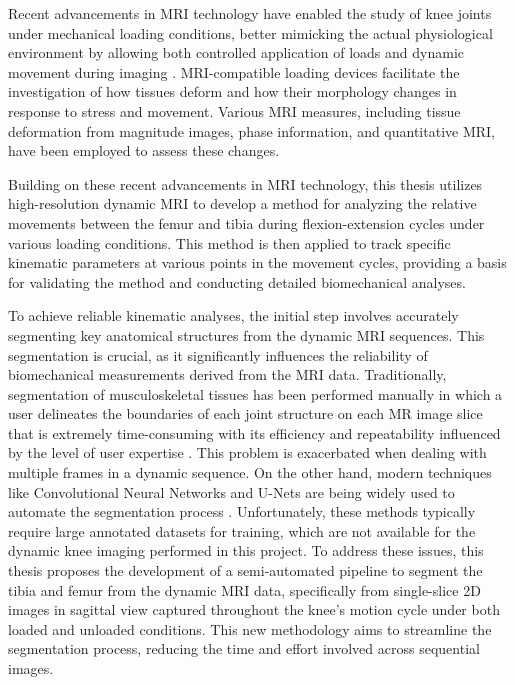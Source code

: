 \documentclass{micro-econ-thesis}
\begin{document}
Recent advancements in MRI technology have enabled the study of knee joints under mechanical loading conditions, better mimicking the actual physiological environment by allowing both controlled application of loads and dynamic movement during imaging \autocite{brisson_repeatability_2024} \parencite{conconi_-vivo_2023} \parencite{jogi_device_2022}. MRI-compatible loading devices facilitate the investigation of how tissues deform and how their morphology changes in response to stress and movement.  Various MRI measures, including tissue deformation from magnitude images, phase information, and quantitative MRI, have been employed to assess these changes. 

Building on these recent advancements in MRI technology, this thesis utilizes high-resolution dynamic MRI to develop a method for analyzing the relative movements between the femur and tibia during flexion-extension cycles under various loading conditions.  This method is then applied to track specific kinematic parameters at various points in the movement cycles, providing a basis for validating the method and conducting detailed biomechanical analyses.

To achieve reliable kinematic analyses, the initial step involves accurately segmenting key anatomical structures from the dynamic MRI sequences. This segmentation is crucial, as it significantly influences the reliability of biomechanical measurements derived from the MRI data. Traditionally, segmentation of musculoskeletal tissues has been performed manually in which a user delineates the boundaries of each joint structure on each MR image slice that is extremely time-consuming with its efficiency and repeatability influenced by the level of user expertise \parencite{mcwalter_use_2005}. This problem is exacerbated when dealing with multiple frames in a dynamic sequence. On the other hand, modern techniques like Convolutional Neural Networks and U-Nets are being widely used to automate the segmentation process \parencite{liu_deep_2018}. Unfortunately, these methods typically require large annotated datasets for training, which are not available for the dynamic knee imaging performed in this project. To address these issues, this thesis proposes the development of a semi-automated pipeline to segment the tibia and femur from the dynamic MRI data, specifically from single-slice 2D images in sagittal view captured throughout the knee's motion cycle under both loaded and unloaded conditions. This new methodology aims to streamline the segmentation process, reducing the time and effort involved across sequential images.
\end{document}
